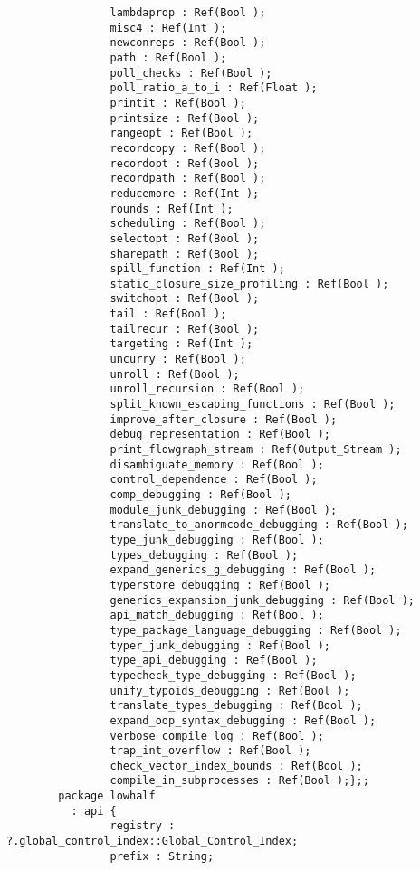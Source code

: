 \begin{verbatim}
                lambdaprop : Ref(Bool );
                misc4 : Ref(Int );
                newconreps : Ref(Bool );
                path : Ref(Bool );
                poll_checks : Ref(Bool );
                poll_ratio_a_to_i : Ref(Float );
                printit : Ref(Bool );
                printsize : Ref(Bool );
                rangeopt : Ref(Bool );
                recordcopy : Ref(Bool );
                recordopt : Ref(Bool );
                recordpath : Ref(Bool );
                reducemore : Ref(Int );
                rounds : Ref(Int );
                scheduling : Ref(Bool );
                selectopt : Ref(Bool );
                sharepath : Ref(Bool );
                spill_function : Ref(Int );
                static_closure_size_profiling : Ref(Bool );
                switchopt : Ref(Bool );
                tail : Ref(Bool );
                tailrecur : Ref(Bool );
                targeting : Ref(Int );
                uncurry : Ref(Bool );
                unroll : Ref(Bool );
                unroll_recursion : Ref(Bool );
                split_known_escaping_functions : Ref(Bool );
                improve_after_closure : Ref(Bool );
                debug_representation : Ref(Bool );
                print_flowgraph_stream : Ref(Output_Stream );
                disambiguate_memory : Ref(Bool );
                control_dependence : Ref(Bool );
                comp_debugging : Ref(Bool );
                module_junk_debugging : Ref(Bool );
                translate_to_anormcode_debugging : Ref(Bool );
                type_junk_debugging : Ref(Bool );
                types_debugging : Ref(Bool );
                expand_generics_g_debugging : Ref(Bool );
                typerstore_debugging : Ref(Bool );
                generics_expansion_junk_debugging : Ref(Bool );
                api_match_debugging : Ref(Bool );
                type_package_language_debugging : Ref(Bool );
                typer_junk_debugging : Ref(Bool );
                type_api_debugging : Ref(Bool );
                typecheck_type_debugging : Ref(Bool );
                unify_typoids_debugging : Ref(Bool );
                translate_types_debugging : Ref(Bool );
                expand_oop_syntax_debugging : Ref(Bool );
                verbose_compile_log : Ref(Bool );
                trap_int_overflow : Ref(Bool );
                check_vector_index_bounds : Ref(Bool );
                compile_in_subprocesses : Ref(Bool );};;
        package lowhalf
          : api {
                registry : ?.global_control_index::Global_Control_Index;
                prefix : String;

\end{verbatim}
